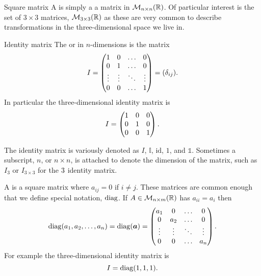 \begin{definition}{Square matrix}{}
    A  is simply a a matrix in \(\mathcal{M}_{{n}\times{n}}({\mathbb{R}})\).
    Of particular interest is the set of \(3\times 3\) matrices, \(\mathcal{M}_{{3}\times{3}}({\mathbb{R}})\) as these are very common to describe transformations in the three-dimensional space we live in.
\end{definition}
\begin{definition}{Identity matrix}{}
    The  or  in \(n\)-dimensions is the matrix
    \[
    I = 
    \begin{pmatrix}
        1 & 0 & \dots & 0\\
        0 & 1 & \dots & 0\\
        \vdots & \vdots & \ddots & \vdots\\
        0 & 0 & \dots & 1
    \end{pmatrix}
    = (\delta_{ij}).
    \]
    In particular the three-dimensional identity matrix is
    \[
    I = 
    \begin{pmatrix}
        1 & 0 & 0\\
        0 & 1 & 0\\
        0 & 0 & 1
    \end{pmatrix}
    .
    \]
\end{definition}
\begin{notation*}{}
    The identity matrix is variously denoted as \(I\), \(\mathbb{I}\), \(\mathrm{id}\), \(1\), and \(\mathds{1}\).
    Sometimes a subscript, \(n\), or \(n\times n\), is attached to denote the dimension of the matrix, such as \(I_3\) or \(I_{3\times 3}\) for the \(3\time 3\) identity matrix.
\end{notation*}
\begin{notation*}{}
    A  is a square matrix where \(a_{ij} = 0\) if \(i \ne j\).
    These matrices are common enough that we define special notation, \(\operatorname{diag}\).
    If \(A\in\mathcal{M}_{{n}\times{m}}({\mathbb{R}})\) has \(a_{ii} = a_i\) then
    \[
    \operatorname{diag}(a_1, a_2, \dotsc, a_n) = \operatorname{diag}(\bm{a}) = 
    \begin{pmatrix}
        a_1 & 0 & \dots & 0\\
        0 & a_2 & \dots & 0\\
        \vdots & \vdots & \ddots & \vdots\\
        0 & 0 & \dots & a_n
    \end{pmatrix}
    .
    \]
    For example the three-dimensional identity matrix is
    \[I = \operatorname{diag}(1, 1, 1).\]
\end{notation*}
